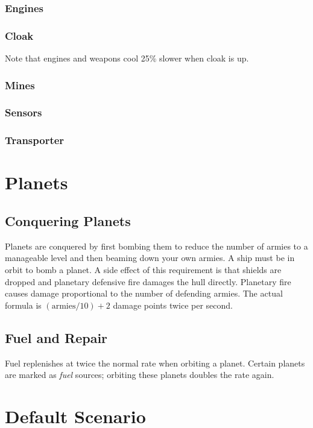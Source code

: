 \subsubsection{Engines}
\subsubsection{Cloak}
Note that engines and weapons cool 25\% slower when
cloak is up.

\subsubsection{Mines}
\subsubsection{Sensors}
\subsubsection{Transporter}

\section{Planets}

\subsection{Conquering Planets}

Planets are conquered by first bombing them to reduce the number of
armies to a manageable level and then beaming down your own armies.  A
ship must be in orbit to bomb a planet.  A side effect of this
requirement is that shields are dropped and planetary defensive fire
damages the hull directly.  Planetary fire causes damage proportional
to the number of defending armies.  The actual formula is
$(\mbox{armies}/ 10) + 2$ damage points twice per second.

\subsection{Fuel and Repair}
Fuel replenishes at twice the normal rate when orbiting a planet.  Certain
planets are marked as {\em fuel} sources;  orbiting these planets doubles
the rate again.

\section{Default Scenario}

